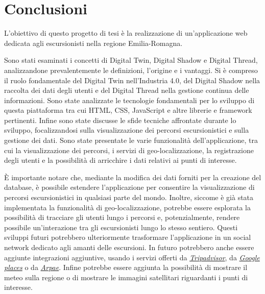 \clearpage{\pagestyle{empty}\cleardoublepage}
\chapter*{Conclusioni}
L'obiettivo di questo progetto di tesi è la realizzazione di un'applicazione web dedicata agli escursionisti nella regione Emilia-Romagna.

Sono stati esaminati i concetti di Digital Twin, Digital Shadow e Digital Thread, analizzandone prevalentemente le definizioni, l'origine e i vantaggi. Si è compreso il ruolo fondamentale del Digital Twin nell'Industria 4.0, del Digital Shadow nella raccolta dei dati degli utenti e del Digital Thread nella gestione continua delle informazioni.
Sono state analizzate le tecnologie fondamentali per lo sviluppo di questa piattaforma tra cui HTML, CSS, JavaScript e altre librerie e framework pertinenti. 
Infine sono state discusse le sfide tecniche affrontate durante lo sviluppo, focalizzandosi sulla visualizzazione dei percorsi escursionistici e sulla gestione dei dati. Sono state presentate le varie funzionalità dell'applicazione, tra cui la visualizzazione dei percorsi, i servizi di geo-localizzazione, la registrazione degli utenti e la possibilità di arricchire i dati relativi ai punti di interesse.

È importante notare che, mediante la modifica dei dati forniti per la creazione del database, è possibile estendere l'applicazione per consentire la visualizzazione di percorsi escursionistici in qualsiasi parte del mondo. Inoltre, siccome è già stata implementata la funzionalità di geo-localizzazione, potrebbe essere esplorata la possibilità di tracciare gli utenti lungo i percorsi e, potenzialmente, rendere possibile un'interazione tra gli escursionisti lungo lo stesso sentiero. Questi sviluppi futuri potrebbero ulteriormente trasformare l'applicazione in un social network dedicato agli amanti delle escursioni. In futuro potrebbero anche essere aggiunte integrazioni aggiuntive, usando i servizi offerti da \href{https://www.tripadvisor.com/}{\textit{Tripadvisor}}, da \href{https://www.google.com/maps/d/viewer?msa=0&iwloc=00044592e21a9f5590527&ved=0COIBEJwFSAE&sa=X&ei=I0ShTO3lOqiijQOHmtz6Aw&mid=1eLqvkQ9wGvMRVrAQsm5g7EdlnSY&ll=39.04394865349766,-76.85871&z=10}{\textit{Google places}} o da \href{https://www.arpae.it/it}{\textit{Arpae}}. Infine potrebbe essere aggiunta la possibilità di mostrare il meteo sulla regione o di mostrare le immagini satellitari riguardanti i punti di interesse.

\clearpage{\pagestyle{empty}\cleardoublepage}